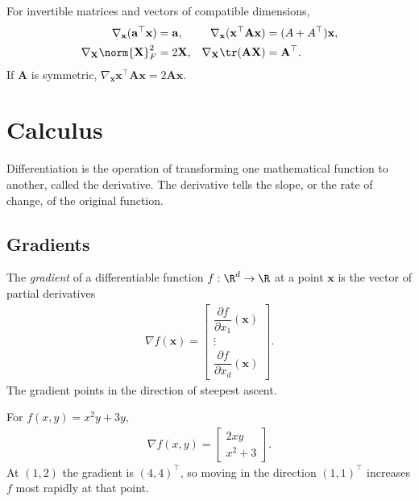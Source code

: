 \documentclass[a4paper, 12pt]{book}
\begin{document}
For invertible matrices and vectors of compatible dimensions,
\begin{align}
    \nabla_{\mathbf{x}} (\mathbf{a}^\top \mathbf{x}) &= \mathbf{a}, &
    \nabla_{\mathbf{x}} (\mathbf{x}^\top \mathbf{A}\mathbf{x}) &= (A+A^\top)\mathbf{x},\\
    \nabla_{\mathbf{X}} \norm{\mathbf{X}}_F^2 &= 2\mathbf{X}, &
    \nabla_{\mathbf{X}} \tr(\mathbf{A}\mathbf{X}) &= \mathbf{A}^\top.
\end{align}
If $\mathbf{A}$ is symmetric, $\nabla_{\mathbf{x}} \mathbf{x}^\top \mathbf{A}\mathbf{x}
= 2\mathbf{A}\mathbf{x}$.

\section{Calculus}

Differentiation is the operation of transforming one mathematical function to another, called the derivative. The derivative tells the slope, or the rate of change, of the original function.

\subsection{Gradients}

\begin{definition}
    The \emph{gradient} of a differentiable function $f : \R^d \to \R$ at a point $\mathbf{x}$ is the vector of partial derivatives
    \begin{align}
    \nabla f(\mathbf{x}) =
    \begin{bmatrix}
        \dfrac{\partial f}{\partial x_1}(\mathbf{x})\\
        \vdots\\
        \dfrac{\partial f}{\partial x_d}(\mathbf{x})
    \end{bmatrix}.
    \end{align}
    The gradient points in the direction of steepest ascent.
\end{definition}

\begin{example}
    For $f(x,y)=x^2y+3y$,
    \begin{align}
        \nabla f(x,y) = \begin{bmatrix}2xy\\ x^2+3\end{bmatrix}.
    \end{align}
    At $(1,2)$ the gradient is $(4,4)^\top$, so moving in the direction $(1,1)^\top$
    increases $f$ most rapidly at that point.
\end{example}
\end{document}

